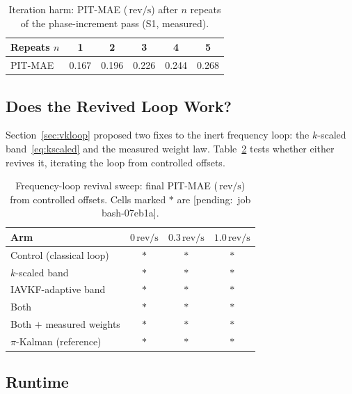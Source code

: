 \documentclass[journal]{IEEEtran}
\newcommand{\revps}{\ensuremath{\,\mathrm{rev/s}}}
\newcommand{\pending}[1]{{\color{gray}\textsf{[pending:~#1]}}}
\begin{document}
\begin{table}[t]
  \centering
  \caption{Iteration harm: PIT-MAE (\revps) after $n$ repeats of the
    phase-increment pass (S1, measured).}
  \label{tab:iterharm}
  \footnotesize
  \begin{tabular}{@{}lccccc@{}}
    \toprule
    Repeats $n$ & 1 & 2 & 3 & 4 & 5 \\
    \midrule
    PIT-MAE & 0.167 & 0.196 & 0.226 & 0.244 & 0.268 \\
    \bottomrule
  \end{tabular}
\end{table}

\subsection{Does the Revived Loop Work?}
\label{sec:revival}

Section~\ref{sec:vkloop} proposed two fixes to the inert frequency loop:
the $k$-scaled band~\eqref{eq:kscaled} and the measured weight law.
Table~\ref{tab:revival} tests whether either revives it, iterating the
loop from controlled offsets.

\begin{table}[t]
  \centering
  \caption{Frequency-loop revival sweep: final PIT-MAE (\revps) from
    controlled offsets. Cells marked $\ast$ are \pending{job bash-07eb1a}.}
  \label{tab:revival}
  \footnotesize
  \setlength{\tabcolsep}{4pt}
  \newcommand{\pd}{{\color{gray}$\ast$}}
  \begin{tabular}{@{}lccc@{}}
    \toprule
    Arm & $0\revps$ & $0.3\revps$ & $1.0\revps$ \\
    \midrule
    Control (classical loop) & \pd & \pd & \pd \\
    $k$-scaled band & \pd & \pd & \pd \\
    IAVKF-adaptive band & \pd & \pd & \pd \\
    Both & \pd & \pd & \pd \\
    Both $+$ measured weights & \pd & \pd & \pd \\
    $\pi$-Kalman (reference) & \pd & \pd & \pd \\
    \bottomrule
  \end{tabular}
\end{table}

\subsection{Runtime}
\end{document}

